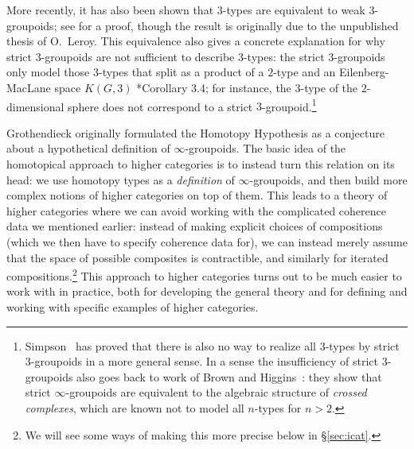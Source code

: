 \documentclass[a4paper,12pt]{article}
\begin{document}
\begin{remark}
  More recently, it has also been shown that $3$-types are equivalent to
  weak $3$-groupoids; see \cite{Berger3Type} for a proof, though the
  result is originally due to the unpublished thesis of O.~Leroy. This
  equivalence also gives a concrete explanation for why strict
  $3$-groupoids are not sufficient to describe $3$-types: the strict
  $3$-groupoids only model those $3$-types that split as a product of a
  $2$-type and an Eilenberg-MacLane space $K(G,3)$
  \cite{Berger3Type}*{Corollary 3.4}; for instance, the $3$-type of the
  $2$-dimensional sphere does not correspond to a strict
  $3$-groupoid.\footnote{Simpson~\cite{Simpson3Type} has proved that
    there is also no way to realize all $3$-types by strict $3$-groupoids
    in a more general sense. In a sense the insufficiency of strict
    $3$-groupoids also goes back to work of Brown and
    Higgins~\cite{BrownHiggins}: they show that strict
    $\infty$-groupoids are equivalent to the algebraic structure of
    \emph{crossed complexes}, which are known not to model all $n$-types for $n > 2$.}
\end{remark}

Grothendieck originally formulated the Homotopy Hypothesis as a
conjecture about a hypothetical definition of $\infty$-groupoids. The
basic idea of the homotopical approach to higher categories is to
instead turn this relation on its head: we use homotopy types as a
\emph{definition} of $\infty$-groupoids, and then build more complex
notions of higher categories on top of them. This leads to a theory of
higher categories where we can avoid working with the complicated
coherence data we mentioned earlier: instead of making explicit
choices of compositions (which we then have to specify coherence data
for), we can instead merely assume that the space of possible
composites is contractible, and similarly for iterated
compositions.\footnote{We will see some ways of making this more
  precise below in \S\ref{sec:icat}.} This approach to higher
categories turns out to be much easier to work with in practice, both
for developing the general theory and for defining and working with
specific examples of higher categories.
\end{document}

